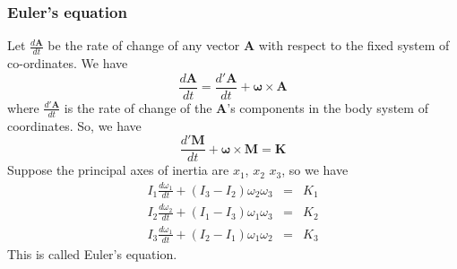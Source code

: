 \subsubsection{Euler's equation}
Let $\frac{d\bm{A}}{dt}$ be the rate of change of any vector $\bm{A}$ with respect to the fixed system of co-ordinates. We have
\[\frac{d\bm{A}}{dt} = \frac{d'\bm{A}}{dt} + \bm{\omega} \times \bm{A}\]
where
$\frac{d'\bm{A}}{dt}$ is the rate of change of the $\bm{A}$'s components in the body system of coordinates. So, we have
\[\frac{d'\bm{M}}{dt} + \bm{\omega} \times \bm{M} = \bm{K}\]
Suppose the principal axes of inertia are $x_1$, $x_2$ $x_3$, so we have
\begin{eqnarray}
I_1 \frac{d\omega_1}{dt} + (I_3-I_2)\omega_2\omega_3 &=& K_1 \nonumber \\
I_2 \frac{d\omega_2}{dt} + (I_1-I_3)\omega_1\omega_3 &=& K_2 \nonumber \\
I_3 \frac{d\omega_1}{dt} + (I_2-I_1)\omega_1\omega_2 &=& K_3 \nonumber
\end{eqnarray}
This is called Euler's equation.
